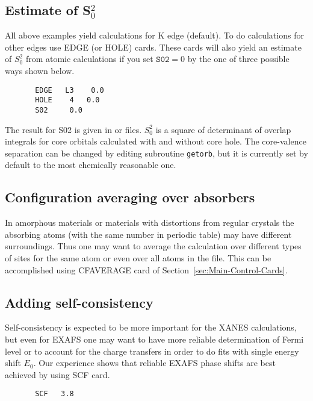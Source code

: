 \documentclass[11pt,oneside]{report} %
\begin{document}
\subsection{Estimate of S$_0^2$}
\label{sec:S02-estimate}


All above examples yield calculations for K edge (default). To do
calculations for other edges use EDGE (or HOLE) cards. These cards
will also yield an estimate of $S_0^2$ from atomic calculations if you
set $\mathtt{S02}=0$ by the one of three possible ways shown below.
\begin{verbatim}
       EDGE   L3    0.0
       HOLE    4   0.0
       S02     0.0
\end{verbatim}

The result for S02 is given in  or  files.
$S_0^2$ is a square of determinant of overlap integrals for core
orbitals calculated with and without core hole. The core-valence
separation can be changed by editing subroutine \texttt{getorb}, but
it is currently set by default to the most chemically reasonable one.


\subsection{Configuration averaging over absorbers}
\label{sec:Aver-over-absorb}


In amorphous materials or materials with distortions from regular
crystals the absorbing atoms (with the same number in periodic table)
may have different surroundings. Thus one may want to average the
calculation over different types of sites for the same atom or even
over all atoms in the  file. This can be accomplished using
CFAVERAGE card of Section~\ref{sec:Main-Control-Cards}.




\subsection{Adding self-consistency}
\label{sec:Adding-self-cons}


Self-consistency is expected to be more important for the XANES
calculations, but even for EXAFS one may want to have more reliable
determination of Fermi level or to account for the charge transfers in
order to do fits with single energy shift $E_0$. Our experience shows
that reliable EXAFS phase shifts are best achieved by using SCF card.

\begin{verbatim}
       SCF   3.8
\end{verbatim}
\end{document}
